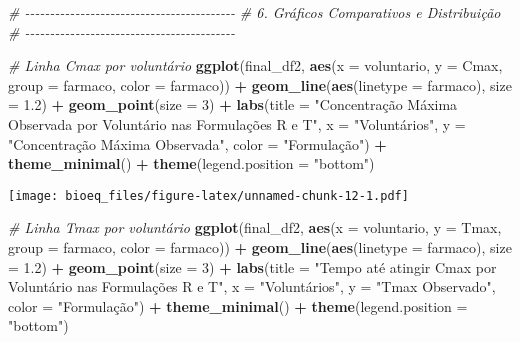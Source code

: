 \documentclass[
]{article}
\newenvironment{Shaded}{\begin{snugshade}}{\end{snugshade}}
\newcommand{\AttributeTok}[1]{\textcolor[rgb]{0.13,0.29,0.53}{#1}}
\newcommand{\CommentTok}[1]{\textcolor[rgb]{0.56,0.35,0.01}{\textit{#1}}}
\newcommand{\DecValTok}[1]{\textcolor[rgb]{0.00,0.00,0.81}{#1}}
\newcommand{\FloatTok}[1]{\textcolor[rgb]{0.00,0.00,0.81}{#1}}
\newcommand{\FunctionTok}[1]{\textcolor[rgb]{0.13,0.29,0.53}{\textbf{#1}}}
\newcommand{\NormalTok}[1]{#1}
\newcommand{\SpecialCharTok}[1]{\textcolor[rgb]{0.81,0.36,0.00}{\textbf{#1}}}
\newcommand{\StringTok}[1]{\textcolor[rgb]{0.31,0.60,0.02}{#1}}
\begin{document}
\begin{Shaded}
\begin{Highlighting}[]
\CommentTok{\# {-}{-}{-}{-}{-}{-}{-}{-}{-}{-}{-}{-}{-}{-}{-}{-}{-}{-}{-}{-}{-}{-}{-}{-}{-}{-}{-}{-}{-}{-}{-}{-}{-}{-}{-}{-}{-}{-}{-}{-}{-}{-}}
\CommentTok{\# 6. Gráficos Comparativos e Distribuição}
\CommentTok{\# {-}{-}{-}{-}{-}{-}{-}{-}{-}{-}{-}{-}{-}{-}{-}{-}{-}{-}{-}{-}{-}{-}{-}{-}{-}{-}{-}{-}{-}{-}{-}{-}{-}{-}{-}{-}{-}{-}{-}{-}{-}{-}}

\CommentTok{\# Linha Cmax por voluntário}
\FunctionTok{ggplot}\NormalTok{(final\_df2, }\FunctionTok{aes}\NormalTok{(}\AttributeTok{x =}\NormalTok{ voluntario, }\AttributeTok{y =}\NormalTok{ Cmax, }\AttributeTok{group =}\NormalTok{ farmaco, }\AttributeTok{color =}\NormalTok{ farmaco)) }\SpecialCharTok{+}
  \FunctionTok{geom\_line}\NormalTok{(}\FunctionTok{aes}\NormalTok{(}\AttributeTok{linetype =}\NormalTok{ farmaco), }\AttributeTok{size =} \FloatTok{1.2}\NormalTok{) }\SpecialCharTok{+}
  \FunctionTok{geom\_point}\NormalTok{(}\AttributeTok{size =} \DecValTok{3}\NormalTok{) }\SpecialCharTok{+}
  \FunctionTok{labs}\NormalTok{(}\AttributeTok{title =} \StringTok{"Concentração Máxima Observada por Voluntário nas Formulações R e T"}\NormalTok{,}
       \AttributeTok{x =} \StringTok{"Voluntários"}\NormalTok{, }\AttributeTok{y =} \StringTok{"Concentração Máxima Observada"}\NormalTok{, }\AttributeTok{color =} \StringTok{"Formulação"}\NormalTok{) }\SpecialCharTok{+}
  \FunctionTok{theme\_minimal}\NormalTok{() }\SpecialCharTok{+}
  \FunctionTok{theme}\NormalTok{(}\AttributeTok{legend.position =} \StringTok{"bottom"}\NormalTok{)}
\end{Highlighting}
\end{Shaded}

\texttt{[image: bioeq\_files/figure-latex/unnamed-chunk-12-1.pdf]}

\begin{Shaded}
\begin{Highlighting}[]
\CommentTok{\# Linha Tmax por voluntário}
\FunctionTok{ggplot}\NormalTok{(final\_df2, }\FunctionTok{aes}\NormalTok{(}\AttributeTok{x =}\NormalTok{ voluntario, }\AttributeTok{y =}\NormalTok{ Tmax, }\AttributeTok{group =}\NormalTok{ farmaco, }\AttributeTok{color =}\NormalTok{ farmaco)) }\SpecialCharTok{+}
  \FunctionTok{geom\_line}\NormalTok{(}\FunctionTok{aes}\NormalTok{(}\AttributeTok{linetype =}\NormalTok{ farmaco), }\AttributeTok{size =} \FloatTok{1.2}\NormalTok{) }\SpecialCharTok{+}
  \FunctionTok{geom\_point}\NormalTok{(}\AttributeTok{size =} \DecValTok{3}\NormalTok{) }\SpecialCharTok{+}
  \FunctionTok{labs}\NormalTok{(}\AttributeTok{title =} \StringTok{"Tempo até atingir Cmax por Voluntário nas Formulações R e T"}\NormalTok{,}
       \AttributeTok{x =} \StringTok{"Voluntários"}\NormalTok{, }\AttributeTok{y =} \StringTok{"Tmax Observado"}\NormalTok{, }\AttributeTok{color =} \StringTok{"Formulação"}\NormalTok{) }\SpecialCharTok{+}
  \FunctionTok{theme\_minimal}\NormalTok{() }\SpecialCharTok{+}
  \FunctionTok{theme}\NormalTok{(}\AttributeTok{legend.position =} \StringTok{"bottom"}\NormalTok{)}
\end{Highlighting}
\end{Shaded}
\end{document}
